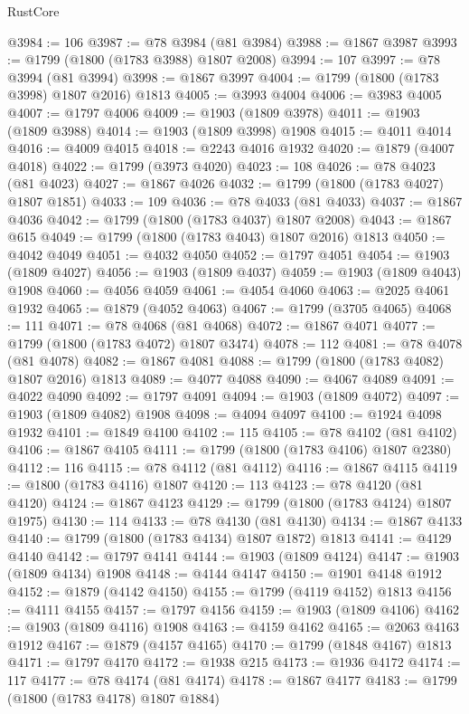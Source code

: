 \begin{lexlean}{RustCore}
\begin{coremodule}
@3984 := 106
@3987 := @78 @3984 (@81 @3984)
@3988 := @1867 @3987
@3993 := @1799 (@1800 (@1783 @3988) @1807 @2008)
@3994 := 107
@3997 := @78 @3994 (@81 @3994)
@3998 := @1867 @3997
@4004 := @1799 (@1800 (@1783 @3998) @1807 @2016) @1813
@4005 := @3993 @4004
@4006 := @3983 @4005
@4007 := @1797 @4006
@4009 := @1903 (@1809 @3978)
@4011 := @1903 (@1809 @3988)
@4014 := @1903 (@1809 @3998) @1908
@4015 := @4011 @4014
@4016 := @4009 @4015
@4018 := @2243 @4016 @1932
@4020 := @1879 (@4007 @4018)
@4022 := @1799 (@3973 @4020)
@4023 := 108
@4026 := @78 @4023 (@81 @4023)
@4027 := @1867 @4026
@4032 := @1799 (@1800 (@1783 @4027) @1807 @1851)
@4033 := 109
@4036 := @78 @4033 (@81 @4033)
@4037 := @1867 @4036
@4042 := @1799 (@1800 (@1783 @4037) @1807 @2008)
@4043 := @1867 @615
@4049 := @1799 (@1800 (@1783 @4043) @1807 @2016) @1813
@4050 := @4042 @4049
@4051 := @4032 @4050
@4052 := @1797 @4051
@4054 := @1903 (@1809 @4027)
@4056 := @1903 (@1809 @4037)
@4059 := @1903 (@1809 @4043) @1908
@4060 := @4056 @4059
@4061 := @4054 @4060
@4063 := @2025 @4061 @1932
@4065 := @1879 (@4052 @4063)
@4067 := @1799 (@3705 @4065)
@4068 := 111
@4071 := @78 @4068 (@81 @4068)
@4072 := @1867 @4071
@4077 := @1799 (@1800 (@1783 @4072) @1807 @3474)
@4078 := 112
@4081 := @78 @4078 (@81 @4078)
@4082 := @1867 @4081
@4088 := @1799 (@1800 (@1783 @4082) @1807 @2016) @1813
@4089 := @4077 @4088
@4090 := @4067 @4089
@4091 := @4022 @4090
@4092 := @1797 @4091
@4094 := @1903 (@1809 @4072)
@4097 := @1903 (@1809 @4082) @1908
@4098 := @4094 @4097
@4100 := @1924 @4098 @1932
@4101 := @1849 @4100
@4102 := 115
@4105 := @78 @4102 (@81 @4102)
@4106 := @1867 @4105
@4111 := @1799 (@1800 (@1783 @4106) @1807 @2380)
@4112 := 116
@4115 := @78 @4112 (@81 @4112)
@4116 := @1867 @4115
@4119 := @1800 (@1783 @4116) @1807
@4120 := 113
@4123 := @78 @4120 (@81 @4120)
@4124 := @1867 @4123
@4129 := @1799 (@1800 (@1783 @4124) @1807 @1975)
@4130 := 114
@4133 := @78 @4130 (@81 @4130)
@4134 := @1867 @4133
@4140 := @1799 (@1800 (@1783 @4134) @1807 @1872) @1813
@4141 := @4129 @4140
@4142 := @1797 @4141
@4144 := @1903 (@1809 @4124)
@4147 := @1903 (@1809 @4134) @1908
@4148 := @4144 @4147
@4150 := @1901 @4148 @1912
@4152 := @1879 (@4142 @4150)
@4155 := @1799 (@4119 @4152) @1813
@4156 := @4111 @4155
@4157 := @1797 @4156
@4159 := @1903 (@1809 @4106)
@4162 := @1903 (@1809 @4116) @1908
@4163 := @4159 @4162
@4165 := @2063 @4163 @1912
@4167 := @1879 (@4157 @4165)
@4170 := @1799 (@1848 @4167) @1813
@4171 := @1797 @4170
@4172 := @1938 @215
@4173 := @1936 @4172
@4174 := 117
@4177 := @78 @4174 (@81 @4174)
@4178 := @1867 @4177
@4183 := @1799 (@1800 (@1783 @4178) @1807 @1884)

\end{coremodule}
\end{lexlean}
